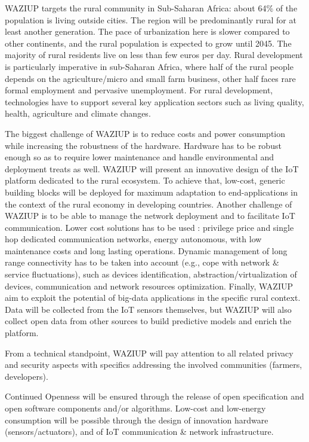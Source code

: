 WAZIUP targets the rural community in Sub-Saharan Africa: about 64\% of the population is living outside cities.
The region will be predominantly rural for at least another generation.
The pace of urbanization here is slower compared to other continents, and the rural population is expected to grow until 2045.
The majority of rural residents live on less than few euros per day.
Rural development is particularly imperative in sub-Saharan Africa, where half of the rural people depends on the agriculture/micro and small farm business, other half faces rare formal employment and pervasive unemployment.
For rural development, technologies have to support several key application sectors such as living quality, health, agriculture and climate changes.

The biggest challenge of WAZIUP is to reduce costs and power consumption while increasing the robustness of the hardware.
Hardware has to be robust enough so as to require lower maintenance and handle environmental and deployment treats as well.
WAZIUP will present an innovative design of the IoT platform dedicated to the rural ecosystem.
To achieve that, low-cost, generic building blocks will be deployed for maximum adaptation to end-applications in the context of the rural economy in developing countries.
Another challenge of WAZIUP is to be able to manage the network deployment and to facilitate IoT communication.
Lower cost solutions has to be used : privilege price and single hop dedicated communication networks, energy autonomous, with low maintenance costs and long lasting operations.
Dynamic management of long range connectivity has to be taken into account (e.g., cope with network \& service fluctuations), such as devices identification, abstraction/virtualization of devices, communication and network resources optimization.
Finally, WAZIUP aim to exploit the potential of big-data applications in the specific rural context.
Data will be collected from the IoT sensors themselves, but WAZIUP will also collect open data from other sources to build predictive models and enrich the platform.

From a technical standpoint, WAZIUP will pay attention to all related privacy and security aspects with specifics addressing the involved communities (farmers, developers).

Continued Openness will be ensured through the release of open specification and open software components and/or algorithms.
Low-cost and low-energy consumption will be possible through the design of innovation hardware (sensors/actuators), and of IoT communication \& network infrastructure.


